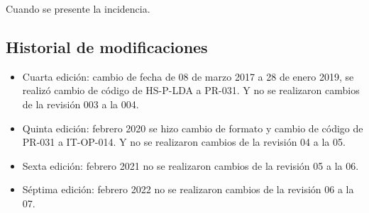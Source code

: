 Cuando se presente la incidencia.

\subsection{Historial de modificaciones}

\begin{itemize}
	\item Cuarta edición: cambio de fecha de 08 de marzo 2017 a 28 de enero 2019, se realizó cambio de código de HS-P-LDA a PR-031. Y no se realizaron cambios de la revisión 003 a la 004.
	\item Quinta edición: febrero 2020 se hizo cambio de formato y cambio de código de PR-031 a IT-OP-014. Y no se realizaron cambios de la revisión 04 a la 05.
	\item Sexta edición: febrero 2021 no se realizaron cambios de la revisión 05 a la 06.
	\item Séptima edición: febrero 2022 no se realizaron cambios de la revisión 06 a la 07.
\end{itemize}
